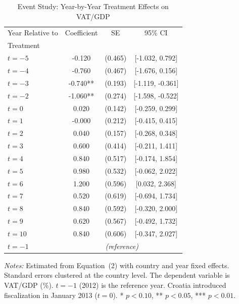 \begin{table}[htbp]
\centering
\caption{Event Study: Year-by-Year Treatment Effects on VAT/GDP}
\label{tab:eventstudy}
\begin{tabular}{lccc}
\hline\hline
Year Relative to & Coefficient & SE & 95\% CI \\
Treatment & & & \\
\hline
$t = -5$ & -0.120 & (0.465) & [-1.032, 0.792] \\
$t = -4$ & -0.760 & (0.467) & [-1.676, 0.156] \\
$t = -3$ & -0.740** & (0.193) & [-1.119, -0.361] \\
$t = -2$ & -1.060** & (0.274) & [-1.598, -0.522] \\
$t = 0$ & 0.020 & (0.142) & [-0.259, 0.299] \\
$t = 1$ & -0.000 & (0.212) & [-0.415, 0.415] \\
$t = 2$ & 0.040 & (0.157) & [-0.268, 0.348] \\
$t = 3$ & 0.600 & (0.414) & [-0.211, 1.411] \\
$t = 4$ & 0.840 & (0.517) & [-0.174, 1.854] \\
$t = 5$ & 0.980 & (0.532) & [-0.062, 2.022] \\
$t = 6$ & 1.200 & (0.596) & [0.032, 2.368] \\
$t = 7$ & 0.520 & (0.619) & [-0.694, 1.734] \\
$t = 8$ & 0.840 & (0.592) & [-0.320, 2.000] \\
$t = 9$ & 0.620 & (0.567) & [-0.492, 1.732] \\
$t = 10$ & 0.840 & (0.606) & [-0.347, 2.027] \\
$t = -1$ & \multicolumn{3}{c}{\textit{(reference)}} \\
\hline\hline
\end{tabular}
\begin{tablenotes}[flushleft]
\footnotesize
\item \textit{Notes:} Estimated from Equation~(2) with country and year fixed effects. Standard errors clustered at the country level. The dependent variable is VAT/GDP (\%). $t = -1$ (2012) is the reference year. Croatia introduced fiscalization in January 2013 ($t = 0$). * $p < 0.10$, ** $p < 0.05$, *** $p < 0.01$.
\end{tablenotes}
\end{table}

